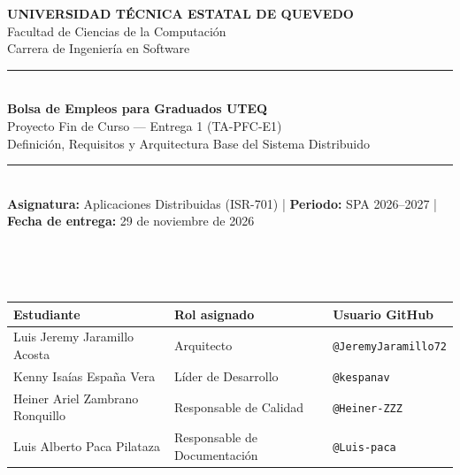 \documentclass[10pt,a4paper]{article}
\begin{document}
\begin{center}
    {\Large \textbf{UNIVERSIDAD TÉCNICA ESTATAL DE QUEVEDO}}\\[0.12cm]
    {\large Facultad de Ciencias de la Computación}\\[0.08cm]
    {\large Carrera de Ingeniería en Software}\\[0.35cm]

    \rule{\linewidth}{0.5mm}\\[0.2cm]
    {\LARGE \textbf{Bolsa de Empleos para Graduados UTEQ}}\\[0.15cm]
    {\large Proyecto Fin de Curso — Entrega 1 (TA-PFC-E1)\\Definición, Requisitos y Arquitectura Base del Sistema Distribuido}\\[0.12cm]
    \rule{\linewidth}{0.5mm}\\[0.35cm]

    \textbf{Asignatura:} Aplicaciones Distribuidas (ISR-701) \quad|\quad
    \textbf{Periodo:} SPA 2026--2027 \quad|\quad
    \textbf{Fecha de entrega:} 29 de noviembre de 2026
\end{center}

\vspace{0.2cm}

\\[0.15cm]
\noindent{}

\vspace{0.35cm}

\\[0.15cm]
\noindent\begin{tabularx}{\textwidth}{>{\raggedright\arraybackslash}X l l}
    \toprule
    \textbf{Estudiante} & \textbf{Rol asignado} & \textbf{Usuario GitHub} \\
    \midrule
    Luis Jeremy Jaramillo Acosta & Arquitecto & \texttt{@JeremyJaramillo72} \\
    Kenny Isaías España Vera & Líder de Desarrollo & \texttt{@kespanav} \\
    Heiner Ariel Zambrano Ronquillo & Responsable de Calidad & \texttt{@Heiner-ZZZ} \\
    Luis Alberto Paca Pilataza & Responsable de Documentación & \texttt{@Luis-paca} \\
    \bottomrule
\end{tabularx}
\end{document}
